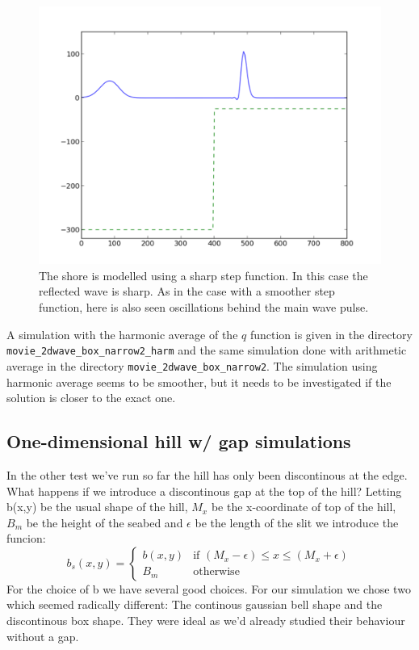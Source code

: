 \documentclass[twoside]{article}
\begin{document}
\begin{figure} 
  \centering
  \includegraphics[scale=0.4]{gustavs_codes/movie_1dwave_box_shore/figure.pdf}
  \caption{The shore is modelled using a sharp step function. In this case the reflected wave is sharp. As in the case with a smoother step function, here is also seen oscillations behind the main wave pulse.}
\end{figure}

A simulation with the harmonic average of the $q$ function is given in the directory \verb+movie_2dwave_box_narrow2_harm+ and the same simulation done with arithmetic average in the directory \verb+movie_2dwave_box_narrow2+. The simulation using harmonic average seems to be smoother, but it needs to be investigated if the solution is closer to the exact one. 
 
\subsection{One-dimensional hill w/ gap simulations}
In the other test we've run so far the hill has only been discontinous at the edge. What happens if we introduce a discontinous gap at the top of the hill? Letting b(x,y) be the usual shape of the hill, $M_x$ be the x-coordinate of top of the hill, $B_m$ be the height of the seabed and $\epsilon$ be the length of the slit we introduce the funcion:
$$ b_s(x,y) = 
\left\{
	\begin{array}{ll}
		b(x,y)  & \mbox{if } (M_x - \epsilon) \le x \le (M_x + \epsilon) \\
		B_m & \mbox{otherwise}
	\end{array}
\right.
$$
For the choice of b we have several good choices. For our simulation we chose two which seemed radically different: The continous gaussian bell shape and the discontinous box shape. They were ideal as we'd already studied their behaviour without a gap. 
\end{document}
